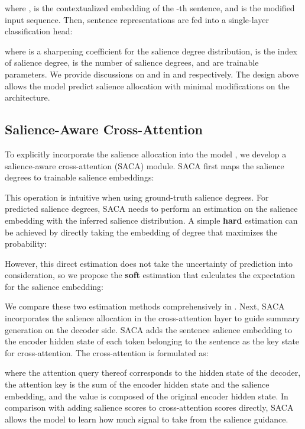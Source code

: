 \documentclass[11pt]{article}
\begin{document}
where , is the contextualized embedding of the -th sentence, and  is the modified input sequence.
Then, sentence representations are fed into a single-layer classification head:
\vspace{-1mm}

where  is a sharpening coefficient for the salience degree distribution,  is the index of salience degree,  is the number of salience degrees,  and  are trainable parameters. 
We provide discussions on  and  in  and  respectively.
The design above allows the model predict salience allocation with minimal modifications on the architecture.

\subsection{Salience-Aware Cross-Attention}
To explicitly incorporate the salience allocation into the model , we develop a salience-aware cross-attention (SACA) module.
SACA first maps the salience degrees to trainable salience embeddings:  \vspace{-1mm}

This operation is intuitive when using ground-truth salience degrees.
For predicted salience degrees, SACA needs to perform an estimation on the salience embedding with the inferred salience distribution.
A simple \textbf{hard} estimation can be achieved by
directly taking the embedding of degree  that maximizes the probability:
\vspace{-1mm}

However, this direct estimation does not take the uncertainty of prediction into consideration, so we propose the \textbf{soft} estimation that calculates the expectation for the salience embedding:
\vspace{-1mm}

We compare these two estimation methods comprehensively in .
Next, SACA incorporates the salience allocation in the cross-attention layer to guide summary generation on the decoder side.
SACA adds the sentence salience embedding to the encoder hidden state of each token belonging to the sentence as the key state for cross-attention.
The cross-attention is formulated as:
\vspace{-1mm}

where the attention query  thereof corresponds to the hidden state of the decoder, the attention key  is the sum of the encoder hidden state and the salience embedding, and
the value  is composed of the original encoder hidden state.
In comparison with adding salience scores to cross-attention scores directly, SACA allows the model to learn how much signal to take from the salience guidance.
\end{document}
